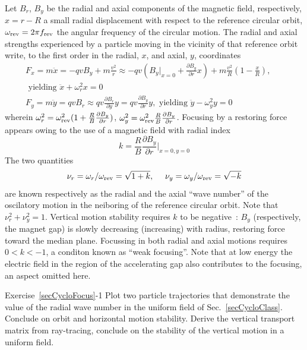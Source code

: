 Let $B_r$, $B_y$  be the radial and axial components of the magnetic field, respectively, 
$x=r-R$ a small radial displacement with respect to the reference circular orbit,  
$\omega_{\rm rev} = 2\pi f_{\rm rev} $ the angular frequency of the circular motion. 
The radial and axial  strengths experienced by a particle moving in the vicinity of that reference orbit 
write, to the first order in the radial, $x$,  and axial, $y$, coordinates 
\begin{eqnarray}
\label{EqCycloFoc}
F_x = m \ddot x=  -qvB_y + m\frac{v^2}{r} \approx -q v (B_y|_{x=0} + \frac{\partial B_y}{\partial r}x)  + m\frac{v^2}{R}(1-\frac{x}{R}), & \nonumber \\ 
\textrm{~yielding~}  \ddot x + \omega_r^2 x=0 &  \nonumber \\
F_y= m\ddot y =   qvB_r \approx q v \frac{\partial B_r}{\partial y} y = q v \frac{\partial B_y}{\partial r} y, 
 \textrm{~yielding~}    \ddot{y} - \omega_y^2 y= 0  & ~ ~ ~ 
\end{eqnarray}
wherein 
$\omega_r^2 = \omega_{\rm rev}^2(1+\frac{R}{B}\frac{\partial B_y}{\partial r})$,  
$ \omega_y^2 = \omega_{\rm rev}^2 \frac{R}{B} \frac{\partial B_y}{\partial r}$. 
Focusing by a restoring force appears owing to the use of a magnetic field with radial 
index 
\begin{equation}
\label{EqCycloRadialIndex}
k = \frac{R}{B}\frac{\partial B_y}{\partial r}|_{x=0,y=0}
\end{equation}
The two quantities 
\begin{equation}
  \nu_r = \omega_r/\omega_{\rm rev} = \sqrt{1+k},   ~ ~ ~ ~ 
 \nu_y=\omega_y /\omega_{\rm rev}  = \sqrt{-k} 
\end{equation}
are known  respectively as the radial and the axial ``wave number'' of 
the oscilatory motion in the neiboring of the reference circular orbit.
Note that $\nu_r^2 + \nu_y^2=1$.
Vertical motion stability requires $k$ to be negative~:  $B_y$ (respectively, the magnet gap) 
is slowly  decreasing (increasing) with radius, restoring force toward the 
median plane. 
Focussing in both radial and axial motions requires $0 < k <-1$, a conditon known as ``weak focusing''.
 Note that  at low energy  the electric field in the 
region of the accelerating gap also contributes to the focusing, an aspect omitted here. 


\smallskip
\noindent {\small $\bullet$} Exercise~\ref{secCycloFocus}-1
Plot two particle trajectories that demonstrate the value of the radial wave number in the uniform 
field of Sec.~\ref{secCycloClass}. Conclude on orbit and horizontal motion  stability. 
Derive the  vertical  transport matrix from ray-tracing, conclude on the stability of the vertical motion
in a uniform field.


